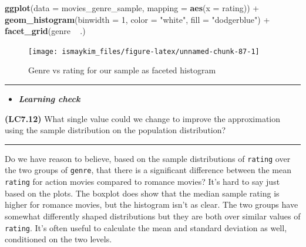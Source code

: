 \documentclass[]{tufte-book}
\newenvironment{Shaded}{\begin{snugshade}}{\end{snugshade}}
\newcommand{\KeywordTok}[1]{\textcolor[rgb]{0.13,0.29,0.53}{\textbf{{#1}}}}
\newcommand{\DataTypeTok}[1]{\textcolor[rgb]{0.13,0.29,0.53}{{#1}}}
\newcommand{\DecValTok}[1]{\textcolor[rgb]{0.00,0.00,0.81}{{#1}}}
\newcommand{\StringTok}[1]{\textcolor[rgb]{0.31,0.60,0.02}{{#1}}}
\newcommand{\NormalTok}[1]{{#1}}
\let\oldrule=\rule
\renewcommand{\rule}[1]{\oldrule{\linewidth}}
\newenvironment{rmdblock}[1]
  {\begin{shaded*}
  \begin{itemize}
  \renewcommand{\labelitemi}{
    \raisebox{-.7\height}[0pt][0pt]{
    }
  }
  \item
  }
  {
  \end{itemize}
  \end{shaded*}
  }
\newenvironment{learncheck}
  {\begin{rmdblock}{warning}}
  {\end{rmdblock}}
\begin{document}
\begin{Shaded}
\begin{Highlighting}[]
\KeywordTok{ggplot}\NormalTok{(}\DataTypeTok{data =} \NormalTok{movies_genre_sample, }\DataTypeTok{mapping =} \KeywordTok{aes}\NormalTok{(}\DataTypeTok{x =} \NormalTok{rating)) +}
\StringTok{  }\KeywordTok{geom_histogram}\NormalTok{(}\DataTypeTok{binwidth =} \DecValTok{1}\NormalTok{, }\DataTypeTok{color =} \StringTok{"white"}\NormalTok{, }\DataTypeTok{fill =} \StringTok{"dodgerblue"}\NormalTok{) +}
\StringTok{  }\KeywordTok{facet_grid}\NormalTok{(genre ~}\StringTok{ }\NormalTok{.)}
\end{Highlighting}
\end{Shaded}

\begin{figure}

{\centering \texttt{[image: ismaykim\_files/figure-latex/unnamed-chunk-87-1]} 

}

\caption[Genre vs rating for our sample as faceted histogram]{Genre vs rating for our sample as faceted histogram}\label{fig:unnamed-chunk-87}
\end{figure}

\begin{center}\rule{0.5\linewidth}{\linethickness}\end{center}

\begin{learncheck}
\textbf{\emph{Learning check}}
\end{learncheck}

\textbf{(LC7.12)} What single value could we change to improve the
approximation using the sample distribution on the population
distribution?

\begin{center}\rule{0.5\linewidth}{\linethickness}\end{center}

Do we have reason to believe, based on the sample distributions of
\texttt{rating} over the two groups of \texttt{genre}, that there is a
significant difference between the mean \texttt{rating} for action
movies compared to romance movies? It's hard to say just based on the
plots. The boxplot does show that the median sample rating is higher for
romance movies, but the histogram isn't as clear. The two groups have
somewhat differently shaped distributions but they are both over similar
values of \texttt{rating}. It's often useful to calculate the mean and
standard deviation as well, conditioned on the two levels.
\end{document}
